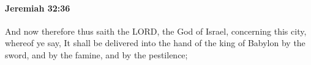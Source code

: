 
		\paragraph{Jeremiah 32:36} %
			\label{JEREMIAH-32-36}

			And now therefore thus saith the LORD, the God of Israel, concerning this city, whereof ye say, It shall be delivered into the hand of the king of Babylon by the sword, and by the famine, and by the pestilence;


